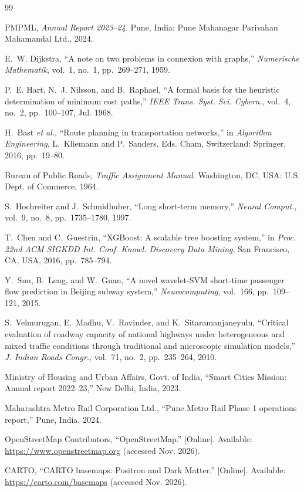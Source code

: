 \documentclass[conference]{IEEEtran}
\begin{document}
\begin{thebibliography}{99}

PMPML, \textit{Annual Report 2023--24}. Pune, India: Pune Mahanagar Parivahan Mahamandal Ltd., 2024.

E.~W. Dijkstra, ``A note on two problems in connexion with graphs,'' \textit{Numerische Mathematik}, vol.~1, no.~1, pp.~269--271, 1959.

P.~E. Hart, N.~J. Nilsson, and B.~Raphael, ``A formal basis for the heuristic determination of minimum cost paths,'' \textit{IEEE Trans. Syst. Sci. Cybern.}, vol.~4, no.~2, pp.~100--107, Jul. 1968.

H.~Bast \textit{et al.}, ``Route planning in transportation networks,'' in \textit{Algorithm Engineering}, L.~Kliemann and P.~Sanders, Eds. Cham, Switzerland: Springer, 2016, pp.~19--80.

Bureau of Public Roads, \textit{Traffic Assignment Manual}. Washington, DC, USA: U.S. Dept. of Commerce, 1964.

S.~Hochreiter and J.~Schmidhuber, ``Long short-term memory,'' \textit{Neural Comput.}, vol.~9, no.~8, pp.~1735--1780, 1997.

T.~Chen and C.~Guestrin, ``XGBoost: A scalable tree boosting system,'' in \textit{Proc. 22nd ACM SIGKDD Int. Conf. Knowl. Discovery Data Mining}, San Francisco, CA, USA, 2016, pp.~785--794.

Y.~Sun, B.~Leng, and W.~Guan, ``A novel wavelet-SVM short-time passenger flow prediction in Beijing subway system,'' \textit{Neurocomputing}, vol.~166, pp.~109--121, 2015.

S.~Velmurugan, E.~Madhu, V.~Ravinder, and K.~Sitaramanjaneyulu, ``Critical evaluation of roadway capacity of national highways under heterogeneous and mixed traffic conditions through traditional and microscopic simulation models,'' \textit{J. Indian Roads Congr.}, vol.~71, no.~2, pp.~235--264, 2010.

Ministry of Housing and Urban Affairs, Govt. of India, ``Smart Cities Mission: Annual report 2022--23,'' New Delhi, India, 2023.

Maharashtra Metro Rail Corporation Ltd., ``Pune Metro Rail Phase 1 operations report,'' Pune, India, 2024.

OpenStreetMap Contributors, ``OpenStreetMap.'' [Online]. Available: \url{https://www.openstreetmap.org} (accessed Nov. 2026).

CARTO, ``CARTO basemaps: Positron and Dark Matter.'' [Online]. Available: \url{https://carto.com/basemaps} (accessed Nov. 2026).

\end{thebibliography}
\end{document}

